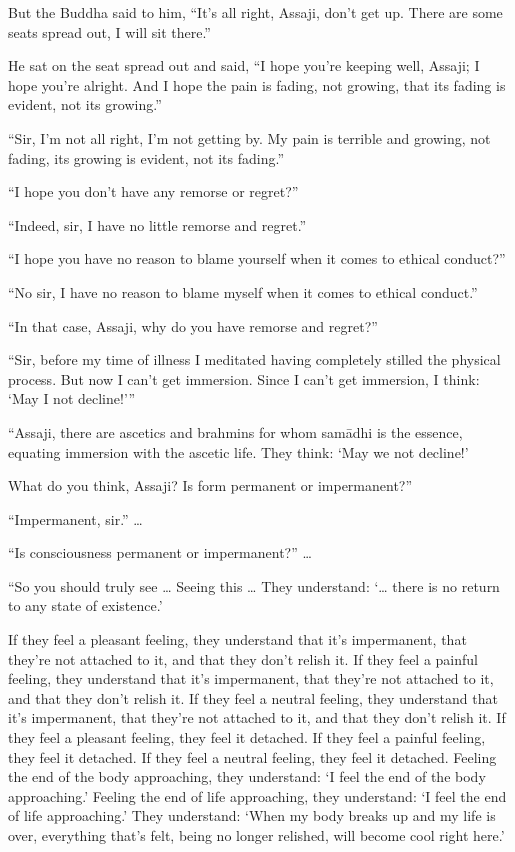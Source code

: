 \documentclass[12pt,openany]{book}%
\begin{document}
But the Buddha said to him, “It’s all right, Assaji, don’t get up. There are some seats spread out, I will sit there.” 

He sat on the seat spread out and said, “I hope you’re keeping well, Assaji; I hope you’re alright. And I hope the pain is fading, not growing, that its fading is evident, not its growing.” 

“Sir, I’m not all right, I’m not getting by. My pain is terrible and growing, not fading, its growing is evident, not its fading.” 

“I hope you don’t have any remorse or regret?” 

“Indeed, sir, I have no little remorse and regret.” 

“I hope you have no reason to blame yourself when it comes to ethical conduct?” 

“No sir, I have no reason to blame myself when it comes to ethical conduct.” 

“In that case, Assaji, why do you have remorse and regret?” 

“Sir, before my time of illness I meditated having completely stilled the physical process. But now I can’t get immersion. Since I can’t get immersion, I think: ‘May I not decline!’” 

“Assaji, there are ascetics and brahmins for whom \textsanskrit{samādhi} is the essence, equating immersion with the ascetic life. They think: ‘May we not decline!’ 

What do you think, Assaji? Is form permanent or impermanent?” 

“Impermanent, sir.” … 

“Is consciousness permanent or impermanent?” … 

“So you should truly see … Seeing this … They understand: ‘… there is no return to any state of existence.’ 

If they feel a pleasant feeling, they understand that it’s impermanent, that they’re not attached to it, and that they don’t relish it. If they feel a painful feeling, they understand that it’s impermanent, that they’re not attached to it, and that they don’t relish it. If they feel a neutral feeling, they understand that it’s impermanent, that they’re not attached to it, and that they don’t relish it. If they feel a pleasant feeling, they feel it detached. If they feel a painful feeling, they feel it detached. If they feel a neutral feeling, they feel it detached. Feeling the end of the body approaching, they understand: ‘I feel the end of the body approaching.’ Feeling the end of life approaching, they understand: ‘I feel the end of life approaching.’ They understand: ‘When my body breaks up and my life is over, everything that’s felt, being no longer relished, will become cool right here.’ 
\end{document}
